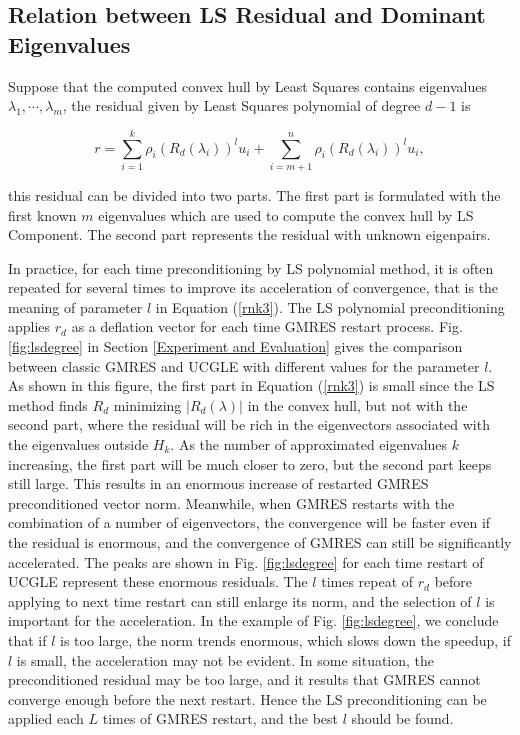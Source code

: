 \subsection{Relation between LS Residual and Dominant Eigenvalues}

Suppose that the computed convex hull by Least Squares contains eigenvalues $\lambda_1,\cdots, \lambda_m$, the residual given by Least Squares polynomial of degree $d-1$ is

\begin{equation}
\label{rnk3}
r = \sum_{i=1}^{k}\rho_i (R_d(\lambda_i))^l u_i + \sum_{i=m+1}^{n}\rho_i (R_d(\lambda_i))^l u_i,
\end{equation}

this residual can be divided into two parts. The first part is formulated with the first known $m$ eigenvalues which are used to compute the convex hull by LS Component. The second part represents the residual with unknown eigenpairs.

In practice, for each time preconditioning by LS polynomial method, it is often repeated for several times to improve its acceleration of convergence, that is the meaning of parameter $l$ in Equation (\ref{rnk3}). The LS polynomial preconditioning applies $r_d$ as a deflation vector for each time GMRES restart process. Fig. \ref{fig:lsdegree} in Section \ref{Experiment and Evaluation} gives the comparison between classic GMRES and UCGLE with different values for the parameter $l$. As shown in this figure, the first part in Equation (\ref{rnk3}) is small since the LS method finds $R_d$ minimizing $|R_d(\lambda)|$ in the convex hull, but not with the second part, where the residual will be rich in the eigenvectors associated with the eigenvalues outside $H_k$. As the number of approximated eigenvalues $k$ increasing, the first part will be much closer to zero, but the second part keeps still large. This results in an enormous increase of restarted GMRES preconditioned vector norm. Meanwhile, when GMRES restarts with the combination of a number of eigenvectors, the convergence will be faster even if the residual is enormous, and the convergence of GMRES can still be significantly accelerated. The peaks are shown in Fig. \ref{fig:lsdegree} for each time restart of UCGLE represent these enormous residuals. The $l$ times repeat of $r_d$ before applying to next time restart can still enlarge its norm, and the selection of $l$ is important for the acceleration. In the example of Fig. \ref{fig:lsdegree}, we conclude that if $l$ is too large, the norm trends enormous, which slows down the speedup, if $l$ is small, the acceleration may not be evident. In some situation, the preconditioned residual may be too large, and it results that GMRES cannot converge enough before the next restart. Hence the LS preconditioning can be applied each $L$ times of GMRES restart, and the best $l$ should be found.

